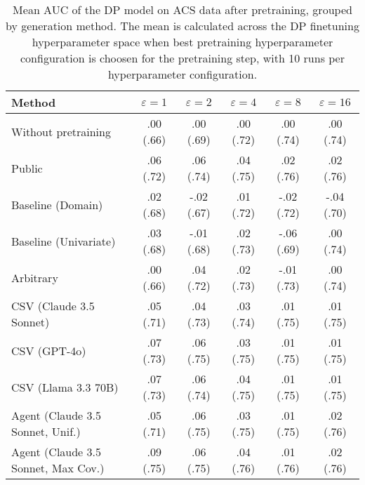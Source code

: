 \begin{table}[h!]
    \centering
    \caption{Mean AUC of the DP model on ACS data after pretraining, grouped by generation method. The mean is calculated across the DP finetuning hyperparameter space when best pretraining hyperparameter configuration is choosen for the pretraining step, with 10 runs per hyperparameter configuration.}
    \label{tab:epsilon_comparison}
    \begin{tabular}{lccccc}
    \toprule
    Method & $\varepsilon=1$ & $\varepsilon=2$ & $\varepsilon=4$ & $\varepsilon=8$ & $\varepsilon=16$ \\
    \midrule
    Without pretraining & .00 {\small (.66)} & .00 {\small (.69)} & .00 {\small (.72)} & .00 {\small (.74)} & .00 {\small (.74)} \\
    \arrayrulecolor{black!50!}\midrule
    Public & .06 {\small (.72)} & .06 {\small (.74)} & \cellcolor{silver!30}.04 {\small (.75)} & \cellcolor{silver!30}.02 {\small (.76)} & \cellcolor{silver!30}.02 {\small (.76)} \\
    \arrayrulecolor{black!50!}\midrule
    Baseline (Domain) & .02 {\small (.68)} & -.02 {\small (.67)} & .01 {\small (.72)} & -.02 {\small (.72)} & -.04 {\small (.70)} \\
    Baseline (Univariate) & .03 {\small (.68)} & -.01 {\small (.68)} & .02 {\small (.73)} & -.06 {\small (.69)} & .00 {\small (.74)} \\
    \arrayrulecolor{black!50!}\midrule
    Arbitrary & .00 {\small (.66)} & .04 {\small (.72)} & .02 {\small (.73)} & -.01 {\small (.73)} & .00 {\small (.74)} \\
    \arrayrulecolor{black!50!}\midrule
    CSV (Claude 3.5 Sonnet) & .05 {\small (.71)} & .04 {\small (.73)} & .03 {\small (.74)} & .01 {\small (.75)} & .01 {\small (.75)} \\
    CSV (GPT-4o) & \cellcolor{bronze!30}.07 {\small (.73)} & .06 {\small (.75)} & .03 {\small (.75)} & .01 {\small (.75)} & .01 {\small (.75)} \\
    CSV (Llama 3.3 70B) & .07 {\small (.73)} & .06 {\small (.74)} & .04 {\small (.75)} & .01 {\small (.75)} & .01 {\small (.75)} \\
    \arrayrulecolor{black!50!}\midrule
    Agent (Claude 3.5 Sonnet, Unif.) & .05 {\small (.71)} & \cellcolor{bronze!30}.06 {\small (.75)} & .03 {\small (.75)} & .01 {\small (.75)} & \cellcolor{bronze!30}.02 {\small (.76)} \\
    Agent (Claude 3.5 Sonnet, Max Cov.) & \cellcolor{gold!30}.09 {\small (.75)} & \cellcolor{gold!30}.06 {\small (.75)} & \cellcolor{gold!30}.04 {\small (.76)} & \cellcolor{bronze!30}.01 {\small (.76)} & \cellcolor{gold!30}.02 {\small (.76)} \\

\end{tabular}
\end{table}
